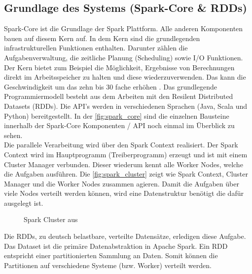 \newpage
\subsection{Grundlage des Systems (Spark-Core \& RDDs)}\label{sec_sparkcore}
Spark-Core ist die Grundlage der Spark Plattform. Alle anderen Komponenten bauen auf diesem Kern auf. In dem Kern sind die grundlegenden infrastrukturellen Funktionen enthalten. Darunter zählen die Aufgabenverwaltung, die zeitliche Planung (Scheduling) sowie I/O Funktionen.
Der Kern bietet zum Beispiel die Möglichkeit, Ergebnisse von Berechnungen direkt im Arbeitsspeicher zu halten und diese wiederzuverwenden. Das kann die Geschwindigkeit um das zehn bis 30 fache erhöhen \cite{VYL+16}. 
Das grundlegende Programmiermodell besteht aus dem Arbeiten mit den Resilent Distributed Datasets (RDDs). Die API's werden in verschiedenen Sprachen (Java, Scala und Python) bereitgestellt. \cite{DATABRICK_ABOUT} In der \autoref{fig:spark_core} sind die einzelnen Bausteine innerhalb der Spark-Core Komponenten / API noch einmal im Überblick zu sehen. \\
 

\noindent
Die parallele Verarbeitung wird über den Spark Context realisiert. Der Spark Context wird im Hauptprogramm (Treiberprogramm) erzeugt und ist mit einem Cluster Manager verbunden. Dieser wiederum kennt alle Worker Nodes, welche die Aufgaben ausführen. Die \autoref{fig:spark_cluster} zeigt wie Spark Context, Cluster Manager und die Worker Nodes zusammen agieren. Damit die Aufgaben über viele Nodes verteilt werden können, wird eine Datenstruktur benötigt die dafür ausgelegt ist. \cite[101]{BDS16}

\begin{figure}[h]
  \centering
  \caption{Spark Cluster aus \cite{SPCLUSTER}}\label{fig:spark_cluster}
\end{figure}



\noindent
Die RDDs, zu deutsch belastbare, verteilte Datensätze, erledigen diese Aufgabe. Das Dataset ist die primäre Datenabstraktion in Apache Spark. 
Ein RDD entspricht einer partitionierten Sammlung an Daten. Somit können die Partitionen auf verschiedene Systeme (bzw. Worker) verteilt werden.  \\

